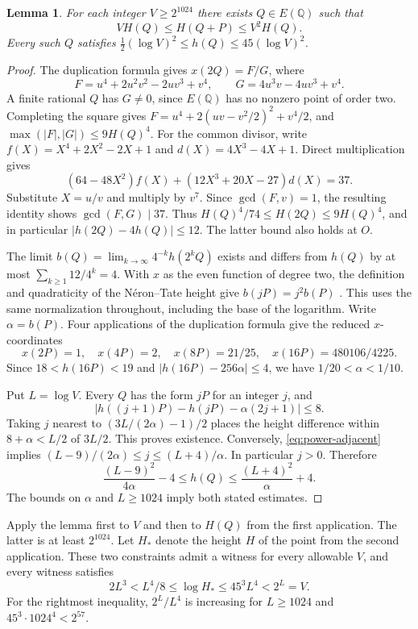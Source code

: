 \documentclass[11pt,letterpaper]{article}
\newtheorem{lemma}[theorem]{Lemma}
\numberwithin{equation}{section}
\begin{document}
\begin{lemma}\label{lem:power-height}
For each integer $V\ge2^{1024}$ there exists $Q\in E(\mathbb Q)$ such that
\begin{equation}\label{eq:power-adjacent}
          V H(Q)\le H(Q+P)\le V^2 H(Q).
\end{equation}
Every such $Q$ satisfies
$\tfrac12(\log V)^2\le h(Q)\le45(\log V)^2$.
\end{lemma}
\begin{proof}
The duplication formula gives $x(2Q)=F/G$, where
\[
 F=u^4+2u^2v^2-2uv^3+v^4,\qquad
 G=4u^3v-4uv^3+v^4.
\]
A finite rational $Q$ has $G\ne0$, since $E(\mathbb Q)$ has no
nonzero point of order two. Completing the square gives
$F=u^4+2(uv-v^2/2)^2+v^4/2$, and
$\max(|F|,|G|)\le9H(Q)^4$. For the common divisor, write
$f(X)=X^4+2X^2-2X+1$ and $d(X)=4X^3-4X+1$. Direct multiplication gives
\[
 (64-48X^2)f(X)+(12X^3+20X-27)d(X)=37.
\]
Substitute $X=u/v$ and multiply by $v^7$. Since $\gcd(F,v)=1$,
the resulting identity shows $\gcd(F,G)\mid37$. Thus
$H(Q)^4/74\le H(2Q)\le9H(Q)^4$, and in particular
$|h(2Q)-4h(Q)|\le12$. The latter bound also holds at $O$.

The limit $b(Q)=\lim_{k\to\infty}4^{-k}h(2^kQ)$ exists and differs
from $h(Q)$ by at most $\sum_{k\ge1}12/4^k=4$. With $x$ as the
even function of degree two, the definition and quadraticity of the
N\'eron--Tate height give $b(jP)=j^2b(P)$
\cite[Chap.~VIII, Section~9, Thm.~9.3(b)]{silverman}. This uses the same
normalization throughout, including the base of the logarithm.
Write $\alpha=b(P)$. Four applications of the duplication formula
give the reduced $x$-coordinates
\[
 x(2P)=1,\quad x(4P)=2,\quad x(8P)=21/25,\quad
 x(16P)=480106/4225.
\]
Since $18<h(16P)<19$ and $|h(16P)-256\alpha|\le4$, we have
$1/20<\alpha<1/10$.

Put $L=\log V$. Every $Q$ has the form $jP$ for an integer $j$, and
\[
 |h((j+1)P)-h(jP)-\alpha(2j+1)|\le8.
\]
Taking $j$ nearest to $(3L/(2\alpha)-1)/2$ places the height difference
within $8+\alpha<L/2$ of $3L/2$. This proves existence. Conversely,
\eqref{eq:power-adjacent} implies
$(L-9)/(2\alpha)\le j\le(L+4)/\alpha$. In particular $j>0$. Therefore
\[
 \frac{(L-9)^2}{4\alpha}-4\le h(Q)
             \le \frac{(L+4)^2}{\alpha}+4 .
\]
The bounds on $\alpha$ and $L\ge1024$ imply both stated estimates.
\end{proof}

Apply the lemma first to $V$ and then to $H(Q)$ from the first
application. The latter is at least $2^{1024}$. Let $H_*$ denote the
height $H$ of the point from the second application. These two
constraints admit a witness for every allowable $V$, and every
witness satisfies
\begin{equation}\label{eq:power-window}
  2L^3 < L^4/8\le \log H_*\le 45^3L^4 < 2^L=V.
\end{equation}
For the rightmost inequality, $2^L/L^4$ is increasing for $L\ge1024$
and $45^3\cdot1024^4<2^{57}$.
\end{document}
